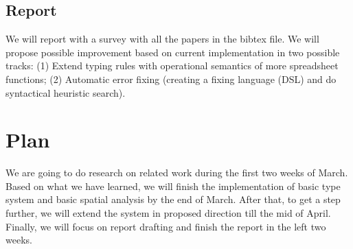 \documentclass[a4paper]{article}
\begin{document}
\subsection{Report}
We will report with a survey with all the papers in the bibtex file. We will propose possible improvement based on current implementation in two possible tracks: (1) Extend typing rules with operational semantics of more spreadsheet functions; (2) Automatic error fixing (creating a fixing language (DSL) and do syntactical heuristic search).

\section{Plan}
We are going to do research on related work during the first two weeks of March. Based on what we have learned, we will finish the implementation of basic type system and basic spatial analysis by the end of March. After that, to get a step further, we will extend the system in proposed direction till the mid of April. Finally, we will focus on report drafting and finish the report in the left two weeks.



\end{document}
